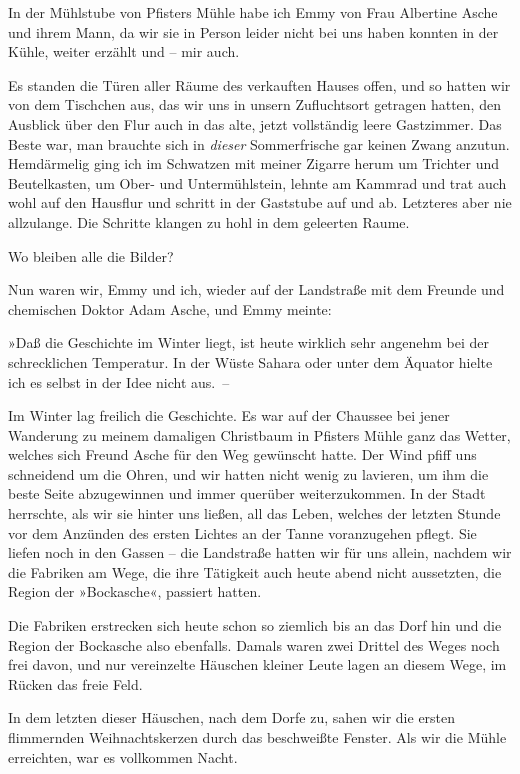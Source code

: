 In der Mühlstube von Pfisters Mühle habe ich Emmy von Frau
Albertine Asche und ihrem Mann, da wir sie in Person leider nicht
bei uns haben konnten in der Kühle, weiter erzählt und – mir auch.

Es standen die Türen aller Räume des verkauften Hauses offen, und
so hatten wir von dem Tischchen aus, das wir uns in unsern
Zufluchtsort getragen hatten, den Ausblick über den Flur auch in
das alte, jetzt vollständig leere Gastzimmer. Das Beste war, man
brauchte sich in \emph{dieser} Sommerfrische gar keinen Zwang
anzutun. Hemdärmelig ging ich im Schwatzen mit meiner Zigarre herum
um Trichter und Beutelkasten, um Ober- und Untermühlstein, lehnte
am Kammrad und trat auch wohl auf den Hausflur und schritt in der
Gaststube auf und ab. Letzteres aber nie allzulange. Die Schritte
klangen zu hohl in dem geleerten Raume.

Wo bleiben alle die Bilder?

Nun waren wir, Emmy und ich, wieder auf der Landstraße mit dem
Freunde und chemischen Doktor Adam Asche, und Emmy meinte:

»Daß die Geschichte im Winter liegt, ist heute wirklich sehr
angenehm bei der schrecklichen Temperatur. In der Wüste Sahara oder
unter dem Äquator hielte ich es selbst in der Idee nicht aus.~–

Im Winter lag freilich die Geschichte. Es war auf der Chaussee bei
jener Wanderung zu meinem damaligen Christbaum in Pfisters Mühle
ganz das Wetter, welches sich Freund Asche für den Weg gewünscht
hatte. Der Wind pfiff uns schneidend um die Ohren, und wir hatten
nicht wenig zu lavieren, um ihm die beste Seite abzugewinnen und
immer querüber weiterzukommen. In der Stadt herrschte, als wir sie
hinter uns ließen, all das Leben, welches der letzten Stunde vor
dem Anzünden des ersten Lichtes an der Tanne voranzugehen pflegt.
Sie liefen noch in den Gassen – die Landstraße hatten wir für uns
allein, nachdem wir die Fabriken am Wege, die ihre Tätigkeit auch
heute abend nicht aussetzten, die Region der »Bockasche«, passiert
hatten.

Die Fabriken erstrecken sich heute schon so ziemlich bis an das
Dorf hin und die Region der Bockasche also ebenfalls. Damals waren
zwei Drittel des Weges noch frei davon, und nur vereinzelte
Häuschen kleiner Leute lagen an diesem Wege, im Rücken das freie
Feld.

In dem letzten dieser Häuschen, nach dem Dorfe zu, sahen wir die
ersten flimmernden Weihnachtskerzen durch das beschweißte Fenster.
Als wir die Mühle erreichten, war es vollkommen Nacht.

